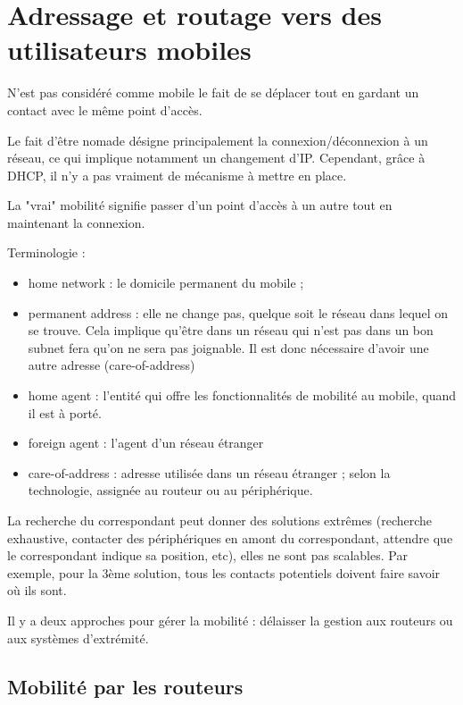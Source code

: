   
	\section{Adressage et routage vers des utilisateurs mobiles}
  
  
	N'est pas considéré comme mobile le fait de se déplacer tout en gardant un contact avec le même point d'accès.
  
	Le fait d'être nomade désigne principalement la connexion/déconnexion à un réseau, ce qui implique notamment un changement d'IP. Cependant, grâce à DHCP, il n'y a pas vraiment de mécanisme à mettre en place.
  
	La "vrai" mobilité signifie passer d'un point d'accès à un autre tout en maintenant la connexion.
  
	Terminologie :
  
	\begin{itemize}
		\item home network : le domicile permanent du mobile ;
		\item permanent address : elle ne change pas, quelque soit le réseau dans lequel on se trouve. Cela implique qu'être dans un réseau qui n'est pas dans un bon subnet fera qu'on ne sera pas joignable. Il est donc nécessaire d'avoir une autre adresse (care-of-address)
		\item home agent : l'entité qui offre les fonctionnalités de mobilité au mobile, quand il est à porté.
		\item foreign agent : l'agent d'un réseau étranger
		\item care-of-address : adresse utilisée dans un réseau étranger ; selon la technologie, assignée au routeur ou au périphérique.
	\end{itemize}
  
	
  
	La recherche du correspondant peut donner des solutions extrêmes (recherche exhaustive, contacter des périphériques en amont du correspondant, attendre que le correspondant indique sa position, etc), elles ne sont pas scalables. Par exemple, pour la 3ème solution, tous les contacts potentiels doivent faire savoir où ils sont.
	
	Il y a deux approches pour gérer la mobilité : délaisser la gestion aux routeurs ou aux systèmes d'extrémité.
  
  	\subsection{Mobilité par les routeurs}
  	
